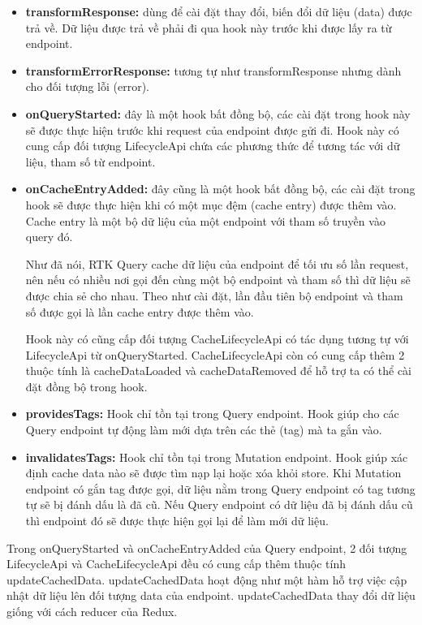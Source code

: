 \begin{itemize}
      \item \textbf{transformResponse:} dùng để cài đặt thay đổi, biến đổi dữ liệu (data) được trả về.
            Dữ liệu được trả về phải đi qua hook này trước khi được lấy ra từ endpoint.
      \item \textbf{transformErrorResponse:} tương tự như transformResponse nhưng dành cho đối tượng lỗi (error).
      \item \textbf{onQueryStarted:} đây là một hook bất đồng bộ, các cài đặt trong hook này sẽ được thực hiện trước khi request của endpoint được gửi đi. Hook này có cung cấp đối tượng LifecycleApi chứa các phương thức để tương tác với dữ liệu, tham số từ endpoint.
      \item \textbf{onCacheEntryAdded:} đây cũng là một hook bất đồng bộ, các cài đặt trong hook sẽ được thực hiện khi có một mục đệm (cache entry) được thêm vào.
            Cache entry là một bộ dữ liệu của một endpoint với tham số truyền vào query đó.
            
            Như đã nói, RTK Query cache dữ liệu của endpoint để tối ưu số lần request, nên nếu có nhiều nơi gọi đến cùng một bộ endpoint và tham số thì dữ liệu sẽ được chia sẻ cho nhau.
            Theo như cài đặt, lần đầu tiên bộ endpoint và tham số được gọi là lần cache entry được thêm vào.
            
            Hook này có cũng cấp đối tượng CacheLifecycleApi có tác dụng tương tự với LifecycleApi từ onQueryStarted.
            CacheLifecycleApi còn có cung cấp thêm 2 thuộc tính là cacheDataLoaded và cacheDataRemoved để hỗ trợ ta có thể cài đặt đồng bộ trong hook.
      \item \textbf{providesTags:} Hook chỉ tồn tại trong Query endpoint.
            Hook giúp cho các Query endpoint tự động làm mới dựa trên các thẻ (tag) mà ta gắn vào.
      \item \textbf{invalidatesTags:} Hook chỉ tồn tại trong Mutation endpoint.
            Hook giúp xác định cache data nào sẽ được tìm nạp lại hoặc xóa khỏi store.
            Khi Mutation endpoint có gắn tag được gọi, dữ liệu nằm trong Query endpoint có tag tương tự sẽ bị đánh dấu là đã cũ.
            Nếu Query endpoint có dữ liệu đã bị đánh dấu cũ thì endpoint đó sẽ được thực hiện gọi lại để làm mới dữ liệu.
\end{itemize}

Trong onQueryStarted và onCacheEntryAdded của Query endpoint, 2 đối tượng LifecycleApi và CacheLifecycleApi đều có cung cấp thêm thuộc tính updateCachedData.
updateCachedData hoạt động như một hàm hỗ trợ việc cập nhật dữ liệu lên đối tượng data của endpoint.
updateCachedData thay đổi dữ liệu giống với cách reducer của Redux.
\par

